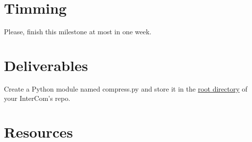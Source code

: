 \section{Timming}

Please, finish this milestone at most in one week.

\section{Deliverables}

Create a Python module named compress.py and store it in the
\href{https://github.com/Tecnologias-multimedia/intercom}{root
  directory} of your InterCom's repo.

\section{Resources}


